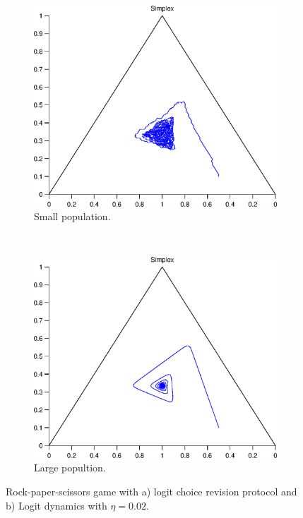 \begin{figure}[tbh]
  \centering
  \begin{subfigure}[b]{0.4\textwidth}
	  \includegraphics[width=\textwidth]{./images/test_finite_logit_choice.eps}
	  \caption{Small population.}
	  \label{fig:finite4_protocol}
  \end{subfigure}
  ~ 
  \begin{subfigure}[b]{0.4\textwidth}
	  \includegraphics[width=\textwidth]{./images/test1_simplex_logit.eps}
	  \caption{Large popultion.}
	  \label{fig:finite4_dynamics}
  \end{subfigure}
  \caption{Rock-paper-scissors game with a) logit choice revision protocol and b) Logit dynamics with $\eta=0.02$.}
  \label{fig:finite4}
\end{figure}






